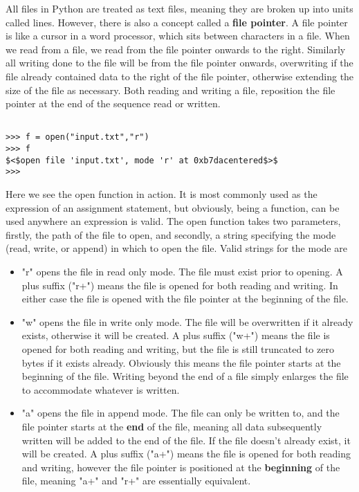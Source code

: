 \documentclass[a4paper,11pt]{article}
\begin{document}
All files in Python are treated as text files, meaning they are   broken up into units called lines. However, there is also a concept   called a \textbf{file pointer}. A file pointer is like a cursor   in a word processor, which sits between characters in a file. When we   read from a file, we read from the file pointer onwards to the right.   Similarly all writing done to the file will be from the file pointer   onwards, overwriting if the file already contained data to the right of   the file pointer, otherwise extending the size of the file as   necessary. Both reading and writing a file, reposition the file pointer   at the end of the sequence read or written.
\begin{lstlisting}

>>> f = open("input.txt","r")
>>> f
$<$open file 'input.txt', mode 'r' at 0xb7dacentered$>$
>>>
\end{lstlisting}

Here we see the open function in action. It is most commonly used as   the expression of an assignment statement, but obviously, being a   function, can be used anywhere an expression is valid. The open   function takes two parameters, firstly, the path of the file to open,   and secondly, a string specifying the mode (read, write, or append) in   which to open the file. Valid strings for the mode are
\begin{itemize}
	\item "r" opens the file in read only mode. The file must exist prior    to opening. A plus suffix ("r+") means the file is opened for both    reading and writing. In either case the file is opened with the    file pointer at the beginning of the file.
	\item "w" opens the file in write only mode. The file will be    overwritten if it already exists, otherwise it will be created. A    plus suffix ("w+") means the file is opened for both reading and    writing, but the file is still truncated to zero bytes if it exists    already. Obviously this means the file pointer starts at the    beginning of the file. Writing beyond the end of a file simply    enlarges the file to accommodate whatever is written.
	\item "a" opens the file in append mode. The file can only be written    to, and the file pointer starts at the \textbf{end} of the    file, meaning all data subsequently written will be added to the    end of the file. If the file doesn't already exist, it will be    created. A plus suffix ("a+") means the file is opened for both    reading and writing, however the file pointer is positioned at the    \textbf{beginning} of the file, meaning "a+" and "r+" are    essentially equivalent.
\end{itemize}
\end{document}
